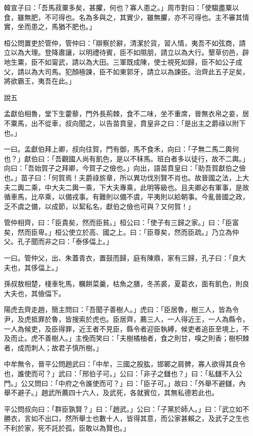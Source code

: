 \begin{pinyinscope}
韓宣子曰：「吾馬菽粟多矣，甚臞，何也？寡人患之。」周市對曰：「使騶盡粟以食，雖無肥，不可得也。名為多與之，其實少，雖無臞，亦不可得也。主不審其情實，坐而患之，馬猶不肥也。」

桓公問置吏於管仲，管仲曰：「辯察於辭，清潔於貨，習人情，夷吾不如弦商，請立以為大理。登降肅讓，以明禮待賓，臣不如隰朋，請立以為大行。墾草仞邑，辟地生粟，臣不如甯武，請以為大田。三軍既成陳，使士視死如歸，臣不如公子成父，請以為大司馬。犯顏極諫，臣不如東郭牙，請立以為諫臣。治齊此五子足矣，將欲霸王，夷吾在此。」

說五

孟獻伯相魯，堂下生藿藜，門外長荊棘，食不二味，坐不重席，晉無衣帛之妾，居不粟馬，出不從車，叔向聞之，以告苗賁皇，賁皇非之曰：「是出主之爵祿以附下也。」

一曰。孟獻伯拜上卿，叔向往賀，門有御，馬不食禾，向曰：「子無二馬二輿何也？」獻伯曰：「吾觀國人尚有飢色，是以不秣馬。班白者多以徒行，故不二輿。」向曰：「吾始賀子之拜卿，今賀子之儉也。」向出，語苗賁皇曰：「助吾賀獻伯之儉也。」苗子曰：「何賀焉！夫爵祿旂章，所以異功伐別賢不肖也。故晉國之法，上大夫二輿二乘，中大夫二輿一乘，下大夫專乘，此明等級也。且夫卿必有軍事，是故循車馬，比卒乘，以備戎事。有難則以備不虞，平夷則以給朝事。今亂晉國之政，乏不虞之備，以成節，以絜私名，獻伯之儉也可與？又何賀！」

管仲相齊，曰：「臣貴矣，然而臣貧。」桓公曰：「使子有三歸之家。」曰：「臣富矣，然而臣卑。」桓公使立於高、國之上。曰：「臣尊矣，然而臣疏。」乃立為仲父。孔子聞而非之曰：「泰侈偪上。」

一曰。管仲父，出、朱蓋青衣，置鼓而歸，庭有陳鼎，家有三歸，孔子曰：「良大夫也，其侈偪上。」

孫叔敖相楚，棧車牝馬，糲餅菜羹，枯魚之膳，冬羔裘，夏葛衣，面有飢色，則良大夫也，其儉偪下。

陽虎去齊走趙，簡主問曰：「吾聞子善樹人。」虎曰：「臣居魯，樹三人，皆為令尹，及虎抵罪於魯，皆搜索於虎也。臣居齊，薦三人，一人得近王，一人為縣令，一人為候吏，及臣得罪，近王者不見臣，縣令者迎臣執縛，候吏者追臣至境上，不及而止。虎不善樹人。」主俛而笑曰：「夫樹橘柚者，食之則甘，嗅之則香；樹枳棘者，成而刺人；故君子慎所樹。」

中牟無令，晉平公問趙武曰：「中牟，三國之股肱，邯鄲之肩髀，寡人欲得其良令也，誰使而可？」武曰：「邢伯子可。」公曰：「非子之讎也？」曰：「私讎不入公門。」公又問曰：「中府之令誰使而可？」曰：「臣子可。」故曰：「外舉不避讎，內舉不避子。」趙武所薦四十六人，及武死，各就賓位，其無私德若此也。

平公問叔向曰：「群臣孰賢？」曰：「趙武。」公曰：「子黨於師人。」曰：「武立如不勝衣，言如不出口，然所舉士也數十人，皆得其意，而公家甚賴之，及武子之生也不利於家，死不託於孤，臣敢以為賢也。」


\end{pinyinscope}
